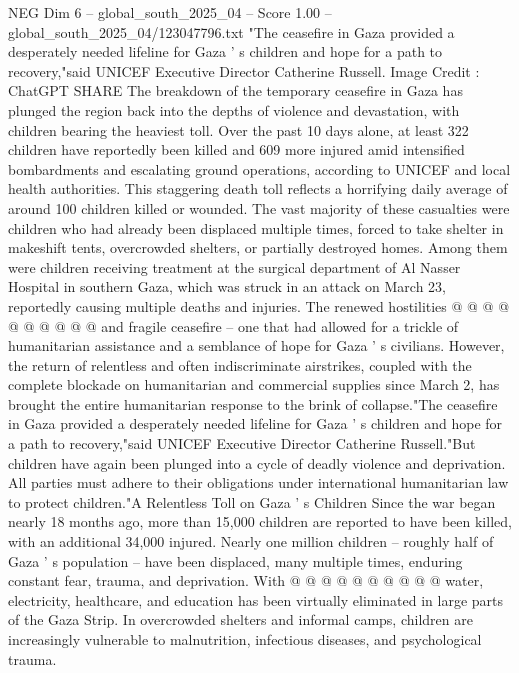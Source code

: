 \begin{textsample}{NEG Dim 6 – global\_south\_2025\_04 – Score 1.00 – global\_south\_2025\_04/123047796.txt}  \label{ex:f6_neg_174}
"The ceasefire in Gaza provided a desperately needed lifeline for Gaza ' s children and hope for a path to recovery,"said UNICEF Executive Director Catherine Russell.
Image Credit : ChatGPT SHARE The breakdown of the temporary ceasefire in Gaza has plunged the region back into the depths of violence and devastation, with children bearing the heaviest toll.
Over the past 10 days alone, at least 322 children have reportedly been killed and 609 more injured amid intensified bombardments and escalating ground operations, according to UNICEF and local health authorities.
This staggering death toll reflects a horrifying daily average of around 100 children killed or wounded.
The vast majority of these casualties were children who had already been displaced multiple times, forced to take shelter in makeshift tents, overcrowded shelters, or partially destroyed homes.
Among them were children receiving treatment at the surgical department of Al Nasser Hospital in southern Gaza, which was struck in an attack on March 23, reportedly causing multiple deaths and injuries.
The renewed hostilities @ @ @ @ @ @ @ @ @ @ and fragile ceasefire -- one that had allowed for a trickle of humanitarian assistance and a semblance of hope for Gaza ' s civilians.
However, the return of relentless and often indiscriminate airstrikes, coupled with the complete blockade on humanitarian and commercial supplies since March 2, has brought the entire humanitarian response to the brink of collapse."The ceasefire in Gaza provided a desperately needed lifeline for Gaza ' s children and hope for a path to recovery,"said UNICEF Executive Director Catherine Russell."But children have again been plunged into a cycle of deadly violence and deprivation.
All parties must adhere to their obligations under international humanitarian law to protect children."A Relentless Toll on Gaza ' s Children Since the war began nearly 18 months ago, more than 15,000 children are reported to have been killed, with an additional 34,000 injured.
Nearly one million children -- roughly half of Gaza ' s population -- have been displaced, many multiple times, enduring constant fear, trauma, and deprivation.
With @ @ @ @ @ @ @ @ @ @ water, electricity, healthcare, and education has been virtually eliminated in large parts of the Gaza Strip.
In overcrowded shelters and informal camps, children are increasingly vulnerable to malnutrition, infectious diseases, and psychological trauma.

\end{textsample}
